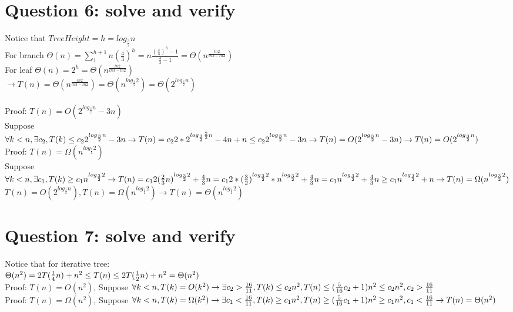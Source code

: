\documentclass[]{article}
\begin{document}
\section{Question 6: solve and verify}
Notice that $TreeHeight=h = log_{\frac{3}{2}}n$\\
For branch $\Theta(n) = \sum _{1}^{h + 1} n(\frac{4}{3})^h = n\frac{(\frac{4}{3})^h - 1}{\frac{4}{3} - 1} = \Theta(n^{\frac{ln2}{ln3-ln2}})$\\
For leaf $\Theta(n) = 2^h = \Theta(n^{\frac{ln2}{ln3-ln2}})$\\
$\rightarrow T(n) = \Theta(n^{\frac{ln2}{ln3-ln2}}) = \Theta(n^{log_{\frac{3}{2}}2}) = \Theta(2^{log_{\frac{3}{2}}n})$\\
\\
Proof: $ T(n) = O(2^{log_{\frac{3}{2}}n} - 3n)$ \\
Suppose $\forall k<n, \exists c_{2}, T(k) \le c_{2}2^{log_{\frac{3}{2}}n} - 3n\\
\rightarrow T(n) = c_{2}2*2^{log_{\frac{3}{2}}\frac{2}{3}n} -4n + n \le c_{2}2^{log_{\frac{3}{2}}n} -3n\\
\rightarrow T(n) =  O(2^{log_{\frac{3}{2}}n} -3n)\\
\rightarrow T(n) =  O(2^{log_{\frac{3}{2}}n})\\$
\\
Proof: $ T(n) = \Omega(n^{log_{\frac{3}{2}}2})$ \\
Suppose $\forall k<n, \exists c_{1}, T(k) \ge c_{1}n^{log_{\frac{3}{2}}2}\\
\rightarrow T(n) = c_{1}2(\frac{2}{3}n)^{log_{\frac{3}{2}}2} + \frac{4}{3}n
 = c_{1}2*(\frac{3}{2})^{log_{\frac{3}{2}}2}*n^{log_{\frac{3}{2}}2} + \frac{4}{3}n = c_{1}n^{log_{\frac{3}{2}}2} + \frac{4}{3}n \ge c_{1}n^{log_{\frac{3}{2}}2} + n\\
\rightarrow T(n) = \Omega(n^{log_{\frac{3}{2}}2})\\$
\\
$T(n) =  O(2^{log_{\frac{3}{2}}n}), T(n) = \Omega(n^{log_{\frac{3}{2}}2}) \rightarrow T(n) = \Theta(n^{log_{\frac{3}{2}}2})$
\section{Question 7: solve and verify}

Notice that for iterative tree: \\
$\Theta (n^2) = 2T(\frac{1}{4}n) + n^2 \le T(n) \le 2T(\frac{1}{2}n) + n^2 = \Theta (n^2)\\$
\\
Proof: $T(n) = O(n^2)$, Suppose $\forall k < n, T(k) = O(k^2)\\
\rightarrow \exists c_{2}>\frac{16}{11}, T(k) \le c_{2}n^2, T(n) \le (\frac{5}{16}c_{2} + 1)n^{2} \le c_{2}n^2, c_{2}>\frac{16}{11} \\$
\\
Proof: $T(n) = \Omega(n^2)$, Suppose $\forall k < n, T(k) = \Omega(k^2)\\
\rightarrow \exists c_{1}<\frac{16}{11}, T(k) \ge c_{1}n^2, T(n) \ge (\frac{5}{16}c_{1} + 1)n^{2} \ge c_{1}n^2, c_{1}<\frac{16}{11} \\
\rightarrow T(n) = \Theta(n^2)$\\
\end{document}
